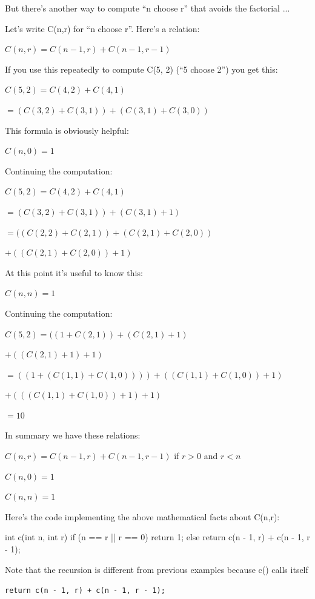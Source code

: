But there's another way to compute ``n choose r'' that
avoids the factorial ...

Let's write C(n,r) for ``n choose r''.
Here's a relation:

$C(n, r) = C(n - 1, r) + C(n - 1, r - 1)$

If you use this repeatedly to compute C(5, 2) (``5 choose 2'') you get
this:

$C(5, 2) = C(4, 2) + C(4, 1)$

$= (C(3, 2) + C(3, 1)) + (C(3, 1) + C(3, 0))$

This formula is obviously helpful:

$C(n, 0) = 1$

Continuing the computation:

$C(5, 2) = C(4, 2) + C(4, 1)$

$= (C(3, 2) + C(3, 1)) + (C(3, 1) + 1)$

$= ((C(2, 2) + C(2, 1)) + (C(2,1) + C(2,0))$

$+ ((C(2, 1) + C(2, 0)) + 1)$

At this point it's useful to know this:

$C(n, n) = 1$

Continuing the computation:

$C(5, 2) = ((1 + C(2, 1)) + (C(2,1) + 1)$

$+ ((C(2, 1) + 1) + 1)$

$= ((1 + (C(1, 1) + C(1, 0)))) + ((C(1, 1) + C(1, 0)) + 1)$

$+ (((C(1, 1) + C(1, 0)) + 1) + 1)$

$= 10$

In summary we have these relations:

$C(n, r) = C(n - 1, r) + C(n - 1, r - 1)$ if $r > 0$ and $r < n$

$C(n, 0) = 1$

$C(n, n) = 1$

Here's the code implementing the above mathematical
facts about C(n,r):

\begin{consolethree}[escapeinside=||]
int c(int n, int r)
{
    if (n == r || r == 0)
    {
        return 1;
    }
    else
    {
        return c(n - 1, r) + c(n - 1, r - 1);
    }
}
\end{consolethree}

Note that the recursion is different from previous examples because c()
calls itself 

\verb!return c(n - 1, r) + c(n - 1, r - 1);!

